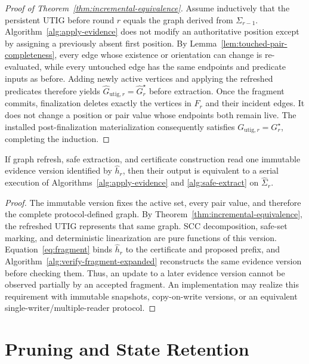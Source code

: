 \begin{proof}[Proof of Theorem~\ref{thm:incremental-equivalence}]
Assume inductively that the persistent UTIG before round $r$ equals the graph
derived from $\Sigma_{r-1}$.  Algorithm~\ref{alg:apply-evidence} does not modify
an authoritative position except by assigning a previously absent first
position.  By Lemma~\ref{lem:touched-pair-completeness}, every edge whose
existence or orientation can change is re-evaluated, while every untouched
edge has the same endpoints and predicate inputs as before.  Adding newly
active vertices and applying the refreshed predicates therefore yields
$\widehat G_{\mathrm{utig},r}=\widehat G_r^\star$ before extraction.  Once the
fragment commits,
finalization deletes exactly the vertices in $F_r$ and their incident edges.
It does not change a position or pair value whose endpoints both remain live.
The installed post-finalization materialization consequently satisfies
$G_{\mathrm{utig},r}=G_r^\star$, completing the induction.
\end{proof}

\begin{lemma}
\label{lem:version-consistent-extraction}
If graph refresh, safe extraction, and certificate construction read one
immutable evidence version identified by $\widehat h_r$, then their output is
equivalent to a serial execution of Algorithms~\ref{alg:apply-evidence} and
\ref{alg:safe-extract} on $\widehat\Sigma_r$.
\end{lemma}

\begin{proof}
The immutable version fixes the active set, every pair value, and therefore
the complete protocol-defined graph.  By
Theorem~\ref{thm:incremental-equivalence}, the refreshed UTIG represents that
same graph.  SCC decomposition, safe-set marking, and deterministic
linearization are pure functions of this version.  Equation~\eqref{eq:fragment}
binds $\widehat h_r$ to the certificate and proposed prefix, and
Algorithm~\ref{alg:verify-fragment-expanded} reconstructs the same evidence version
before checking them.  Thus, an update to a later evidence version cannot be
observed partially by an accepted fragment.  An implementation may realize
this requirement with immutable snapshots, copy-on-write versions, or an
equivalent single-writer/multiple-reader protocol.
\end{proof}

\section{Pruning and State Retention}
\label{app:pruning-retention}

